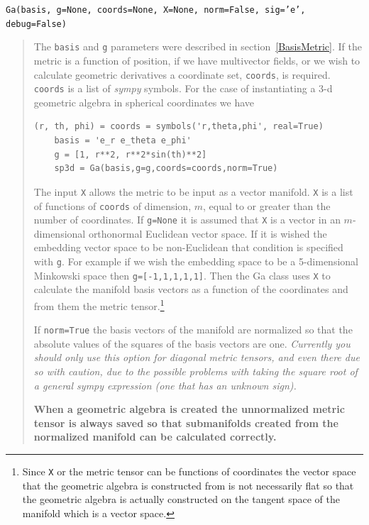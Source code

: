 \documentclass[12pt]{report}
\newcommand{\T}[1]{\texttt{#1}}
\begin{document}
\T{Ga(basis, g=None, coords=None, X=None, norm=False, sig='e', debug=False)}
\begin{quote}
   The \T{basis} and \T{g} parameters were described in section~\ref{BasisMetric}.
   If the metric is a function of position, if we have multivector fields, or we
   wish to calculate geometric derivatives a coordinate set, \T{coords}, is required.
   \T{coords} is a list of \emph{sympy} symbols.  For the case of instantiating a 3-d geometric
   algebra in spherical coordinates we have
   \begin{lstlisting}[numbers=none]
    (r, th, phi) = coords = symbols('r,theta,phi', real=True)
    basis = 'e_r e_theta e_phi'
    g = [1, r**2, r**2*sin(th)**2]
    sp3d = Ga(basis,g=g,coords=coords,norm=True)
   \end{lstlisting}
   The input \T{X} allows the metric to be input as a vector manifold.
   \T{X} is a list of functions of \T{coords} of dimension, $m$, equal to or greater
   than the number of coordinates.  If \T{g=None} it is assumed that \T{X} is a
   vector in an $m$-dimensional orthonormal Euclidean vector space. If it is wished
   the embedding vector space to be non-Euclidean that condition is specified with
   \T{g}.  For example if we wish the embedding space to be a 5-dimensional Minkowski
   space then \T{g=[-1,1,1,1,1]}.  Then the Ga class uses \T{X} to calculate the
   manifold basis vectors as a function of the coordinates and from them the metric
   tensor.\footnote{Since \T{X} or the metric tensor can be functions of coordinates
   the vector space that the geometric algebra is constructed from is not necessarily
   flat so that the geometric algebra is actually constructed on the tangent space of
   the manifold which is a vector space.}

   If \T{norm=True} the basis vectors of the manifold are normalized so that the
   absolute values of the squares of the basis vectors are one. \emph{Currently you
   should only use this option for diagonal metric tensors, and even there due so
   with caution, due to the possible
   problems with taking the square root of a general \emph{sympy} expression (one that has an
   unknown sign).}
   
   \textbf{When a geometric algebra is created the unnormalized metric tensor is always saved
   so that submanifolds created from the normalized manifold can be calculated correctly.}


\end{quote}
\end{document}
